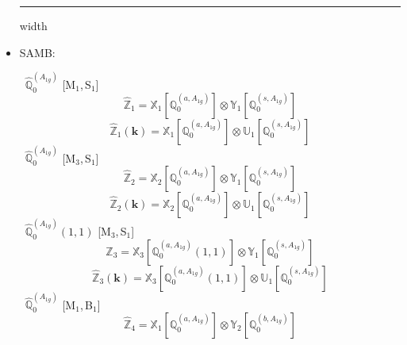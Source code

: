 \documentclass[fleqn,10pt,landscape]{article}
\begin{document}
\begin{itemize}
 \hfil \hrule height 1mm width \textwidth \hfil

\item SAMB:

\vspace{4mm}
\noindent {} $\,\,\,\hat{\mathbb{Q}}_{0}^{(A_{1g})}$ [M$_{1}$,\,S$_{1}$]
\begin{dmath*}
\hat{\mathbb{Z}}_{1}=\mathbb{X}_{1}[\mathbb{Q}_{0}^{(a,A_{1g})}] \otimes\mathbb{Y}_{1}[\mathbb{Q}_{0}^{(s,A_{1g})}]
\end{dmath*}
\begin{dmath*}
\hat{\mathbb{Z}}_{1}(\bm{k})=\mathbb{X}_{1}[\mathbb{Q}_{0}^{(a,A_{1g})}] \otimes\mathbb{U}_{1}[\mathbb{Q}_{0}^{(s,A_{1g})}]
\end{dmath*}
\vspace{4mm}
\noindent {} $\,\,\,\hat{\mathbb{Q}}_{0}^{(A_{1g})}$ [M$_{3}$,\,S$_{1}$]
\begin{dmath*}
\hat{\mathbb{Z}}_{2}=\mathbb{X}_{2}[\mathbb{Q}_{0}^{(a,A_{1g})}] \otimes\mathbb{Y}_{1}[\mathbb{Q}_{0}^{(s,A_{1g})}]
\end{dmath*}
\begin{dmath*}
\hat{\mathbb{Z}}_{2}(\bm{k})=\mathbb{X}_{2}[\mathbb{Q}_{0}^{(a,A_{1g})}] \otimes\mathbb{U}_{1}[\mathbb{Q}_{0}^{(s,A_{1g})}]
\end{dmath*}
\vspace{4mm}
\noindent {} $\,\,\,\hat{\mathbb{Q}}_{0}^{(A_{1g})}(1,1)$ [M$_{3}$,\,S$_{1}$]
\begin{dmath*}
\hat{\mathbb{Z}}_{3}=\mathbb{X}_{3}[\mathbb{Q}_{0}^{(a,A_{1g})}(1,1)] \otimes\mathbb{Y}_{1}[\mathbb{Q}_{0}^{(s,A_{1g})}]
\end{dmath*}
\begin{dmath*}
\hat{\mathbb{Z}}_{3}(\bm{k})=\mathbb{X}_{3}[\mathbb{Q}_{0}^{(a,A_{1g})}(1,1)] \otimes\mathbb{U}_{1}[\mathbb{Q}_{0}^{(s,A_{1g})}]
\end{dmath*}
\vspace{4mm}
\noindent {} $\,\,\,\hat{\mathbb{Q}}_{0}^{(A_{1g})}$ [M$_{1}$,\,B$_{1}$]
\begin{dmath*}
\hat{\mathbb{Z}}_{4}=\mathbb{X}_{1}[\mathbb{Q}_{0}^{(a,A_{1g})}] \otimes\mathbb{Y}_{2}[\mathbb{Q}_{0}^{(b,A_{1g})}]
\end{dmath*}
\begin{dmath*}

\end{dmath*}
\end{itemize}
\end{document}
